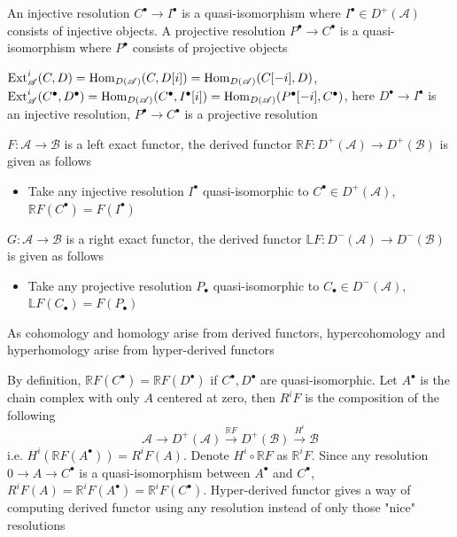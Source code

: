 \documentclass[main]{subfiles}
\begin{document}
\begin{definition}
An injective resolution $C^\bullet\to I^\bullet$ is a quasi-isomorphism where $I^\bullet\in D^+(\mathscr A)$ consists of injective objects. A projective resolution $P^\bullet\to C^\bullet$ is a quasi-isomorphism where $P^\bullet$ consists of projective objects
\end{definition}

\begin{definition}
$\operatorname{Ext}_{\mathscr A}^i(C,D)=\operatorname{Hom}_{D(\mathscr A)}(C,D[i])=\operatorname{Hom}_{D(\mathscr A)}(C[-i],D)$, $\operatorname{Ext}_{\mathscr A}^i(C^\bullet,D^\bullet)=\operatorname{Hom}_{D(\mathscr A)}(C^\bullet,I^\bullet[i])=\operatorname{Hom}_{D(\mathscr A)}(P^\bullet[-i],C^\bullet)$, here $D^\bullet\to I^\bullet$ is an injective resolution, $P^\bullet\to C^\bullet$ is a projective resolution
\end{definition}

\begin{definition}
$F:\mathscr A\to\mathscr B$ is a left exact functor, the derived functor $\mathbb RF:D^+(\mathscr A)\to D^+(\mathscr B)$ is given as follows
\begin{itemize}
\item Take any injective resolution $I^\bullet$ quasi-isomorphic to $C^\bullet\in D^+(\mathscr A)$, $\mathbb RF(C^\bullet)=F(I^\bullet)$
\end{itemize}
$G:\mathscr A\to\mathscr B$ is a right exact functor, the derived functor $\mathbb LF:D^-(\mathscr A)\to D^-(\mathscr B)$ is given as follows
\begin{itemize}
\item Take any projective resolution $P_\bullet$ quasi-isomorphic to $C_\bullet\in D^-(\mathscr A)$, $\mathbb LF(C_\bullet)=F(P_\bullet)$
\end{itemize}
As cohomology and homology arise from derived functors, hypercohomology and hyperhomology arise from hyper-derived functors
\end{definition}

\begin{remark}
By definition, $\mathbb RF(C^\bullet)=\mathbb RF(D^\bullet)$ if $C^\bullet,D^\bullet$ are quasi-isomorphic. Let $A^\bullet$ is the chain complex with only $A$ centered at zero, then $R^iF$ is the composition of the following
\[\mathscr A\to D^+(\mathscr A)\xrightarrow{\mathbb RF}D^+(\mathscr B)\xrightarrow{H^i}\mathscr B\]
i.e. $H^i(\mathbb RF(A^\bullet))=R^iF(A)$. Denote $H^i\circ\mathbb RF$ as $\mathbb R^iF$. Since any resolution $0\to A\to C^\bullet$ is a quasi-isomorphism between $A^\bullet$ and $C^\bullet$, $R^iF(A)=\mathbb R^iF(A^\bullet)=\mathbb R^iF(C^\bullet)$. Hyper-derived functor gives a way of computing derived functor using any resolution instead of only those "nice" resolutions
\end{remark}
\end{document}
